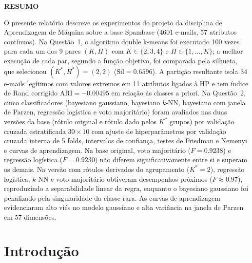 \documentclass[11pt,a4paper]{article}
\newcommand{\Sil}{\mathrm{Sil}}
\newcommand{\ARI}{\mathrm{ARI}}
\begin{document}
\clearpage
\begin{center}
  \bfseries\MakeUppercase{Resumo}
\end{center}
\vspace{0.5cm}

O presente relatório descreve os experimentos do projeto da disciplina de Aprendizagem de Máquina sobre a base Spambase ($\num{4601}$ e-mails, 57 atributos contínuos). 
Na Questão~1, o algoritmo double k-means foi executado 100 vezes para cada um dos 9 pares $(K,H)$ com $K\in\{2,3,4\}$ e $H\in\{1,\dots,K\}$; 
a melhor execução de cada par, segundo a função objetivo, foi comparada pela silhueta, que selecionou $(K^*,H^*)=(2,2)$ ($\Sil=\num{0.6596}$). 
A partição resultante isola 34 e-mails legítimos com valores extremos em 11 atributos ligados à HP e tem índice de Rand corrigido $\ARI=\num{-0.00495}$ 
em relação às classes a priori. Na Questão~2, cinco classificadores (bayesiano gaussiano, bayesiano $k$-NN, bayesiano com janela de Parzen, regressão 
logística e voto majoritário) foram avaliados nas duas versões da base (rótulo original e rótulo dado pelos $K^*$ grupos) por validação cruzada 
estratificada $30\times10$ com ajuste de hiperparâmetros por validação cruzada interna de 5 folds, intervalos de confiança, testes de Friedman e Nemenyi 
e curvas de aprendizagem. Na base original, voto majoritário ($F=\num{0.9238}$) e regressão logística ($F=\num{0.9230}$) não diferem significativamente 
entre si e superam os demais. Na versão com rótulos derivados do agrupamento ($K^*=2$), regressão logística, $k$-NN e voto majoritário obtiveram 
desempenhos próximos ($F\approx\num{0.97}$), reproduzindo a separabilidade linear da regra, enquanto o bayesiano gaussiano foi penalizado pela 
singularidade da classe rara. As curvas de aprendizagem evidenciaram alto viés no modelo gaussiano e alta variância na janela de Parzen em 57 dimensões.

\clearpage
\tableofcontents

\clearpage
\pagestyle{plain}

\section{Introdução}
\end{document}
